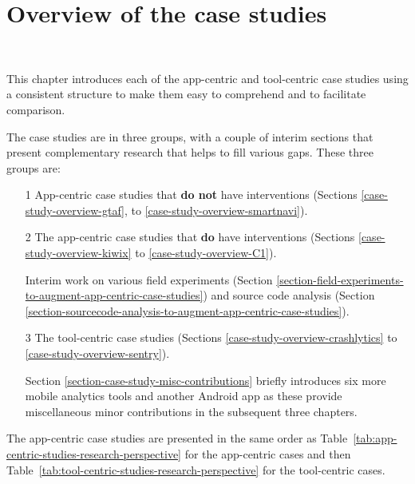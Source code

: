 \chapter{Overview of the case studies}~\label{chapter-case-studies-overview}

This chapter introduces each of the app-centric and tool-centric case studies using a consistent structure to make them easy to comprehend and to facilitate comparison. %

The case studies are in three groups, with a couple of interim sections that present complementary research that helps to fill various gaps. These three groups are: 
\begin{enumerate}
    \itemsep0em
    \item[1] App-centric case studies that \textbf{do not} have interventions (Sections \ref{case-study-overview-gtaf}, to \ref{case-study-overview-smartnavi}).
    \item[2] The app-centric case studies that \textbf{do} have interventions (Sections \ref{case-study-overview-kiwix} to \ref{case-study-overview-C1}).
    \item[ ] Interim work on various field experiments (Section \ref{section-field-experiments-to-augment-app-centric-case-studies}) and source code analysis (Section \ref{section-sourcecode-analysis-to-augment-app-centric-case-studies}).
    \item[3] The tool-centric case studies (Sections \ref{case-study-overview-crashlytics} to \ref{case-study-overview-sentry}).
    \item[ ] Section \ref{section-case-study-misc-contributions} briefly introduces six more mobile analytics tools and another Android app as these provide miscellaneous minor contributions in the subsequent three chapters.
\end{enumerate}

The app-centric case studies are presented in the same order as Table~\ref{tab:app-centric-studies-research-perspective} for the app-centric cases and then Table~\ref{tab:tool-centric-studies-research-perspective} for the tool-centric cases. 

